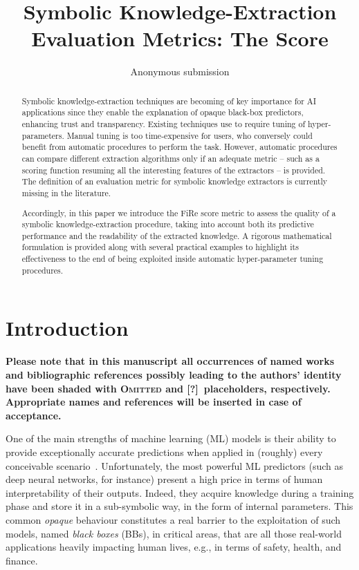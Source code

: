 \documentclass{article}
\title{Symbolic Knowledge-Extraction Evaluation Metrics: The \fire{} Score}
\author{
    Anonymous submission
}
\newcommand{\creepy}{\textsc{Omitted}} %
\newcommand{\fire}{FiRe}
\begin{document}
\maketitle

\begin{abstract}
Symbolic knowledge-extraction techniques are becoming of key importance for AI applications since they enable the explanation of opaque black-box predictors, enhancing trust and transparency.
%
Existing techniques use to require tuning of hyper-parameters. Manual tuning is too time-expensive for users, who conversely could benefit from automatic procedures to perform the task.
%
However, automatic procedures can compare different extraction algorithms only if an adequate metric -- such as a scoring function resuming all the interesting features of the extractors -- is provided.
%
The definition of an evaluation metric for symbolic knowledge extractors is currently missing in the literature.

Accordingly, in this paper we introduce the \fire{} score metric to assess the quality of a symbolic knowledge-extraction procedure, taking into account both its predictive performance and the readability of the extracted knowledge.
%
A rigorous mathematical formulation is provided along with several practical examples to highlight its effectiveness to the end of being exploited inside automatic hyper-parameter tuning procedures.

\end{abstract}

\section{Introduction}
\textbf{Please note that in this manuscript all occurrences of named works and bibliographic references possibly leading to the authors' identity have been shaded with \creepy{} and [?]\ placeholders, respectively. Appropriate names and references will be inserted in case of acceptance.}

One of the main strengths of machine learning (ML) models is their ability to provide exceptionally accurate predictions when applied in (roughly) every conceivable scenario~\cite{rocha2012far}.
%
Unfortunately, the most powerful ML predictors (such as deep neural networks, for instance) present a high price in terms of human interpretability of their outputs.
%
Indeed, they acquire knowledge during a training phase and store it in a sub-symbolic way, in the form of internal parameters.
%
This common \emph{opaque} behaviour constitutes a real barrier to the exploitation of such models, named \emph{black boxes} (BBs), in critical areas, that are all those real-world applications heavily impacting human lives, e.g., in terms of safety, health, and finance.
\end{document}
